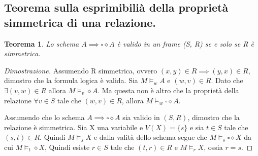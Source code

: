 \documentclass{article}
\theoremstyle{definition}
\theoremstyle{plain}
\theoremstyle{plain}
\theoremstyle{plain}
\newtheorem{teorema}{Teorema}
\theoremstyle{plain}
\begin{document}
\subsection{Teorema sulla esprimibilià della proprietà simmetrica di una relazione.}
\begin{teorema}
    Lo schema $A \implies \square \diamond A$ è valido in un frame (S, R) se e solo se R è simmetrica.
\end{teorema}
\begin{proof}[Dimostrazione]    
    Assumendo R simmetrica, ovvero $(x, y) \in R \implies (y, x) \in R$, dimostro che la formula logica è valida. \newline
    Sia $M \models_w A$ e $(w, v) \in R$. Dato che $\exists (v, w) \in R$ allora $M \models_v \diamond A$. Ma questa non è altro che la proprietà della relazione $\forall v \in S$ tale che $(w, v) \in R$, allora $M \models_w \square \diamond A$. \newline
    
    Assumendo che lo schema $A \implies \square \diamond A$ sia valido in $(S, R)$, dimostro che la relazione è simmetrica. \newline
    Sia X una variabile e $V(X) = \{s\}$ e sia $t \in S$ tale che $(s, t) \in R$. 
    Quindi $M \models_s X$ e dalla valità dello schema segue che $M \models_s \square \diamond X$ da cui $M \models_t \diamond X$, Quindi esiste $r \in S$ tale che $(t, r) \in R$ e $M \models_r X$, ossia $r = s$.
\end{proof}
\end{document}
